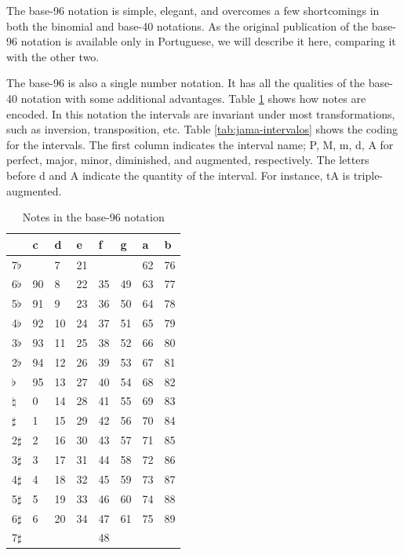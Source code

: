 \documentclass{article}
\begin{document}
The base-96 notation is simple, elegant, and overcomes a few
shortcomings in both the binomial and base-40 notations. As the
original publication of the base-96 notation is available only in
Portuguese, we will describe it here, comparing it with the other
two. 

The base-96 is also a single number notation. It has all the qualities
of the base-40 notation with some additional advantages. Table
\ref{tab:jama-notas} shows how notes are encoded. In this notation the
intervals are invariant under most transformations, such as inversion,
transposition, etc. Table \ref{tab:jama-intervalos} shows the coding
for the intervals. The first column indicates the interval name; P, M,
m, d, A for perfect, major, minor, diminished, and augmented,
respectively. The letters before d and A indicate the quantity of the
interval. For instance, tA is triple-augmented.

\begin{table}
  \centering
  \begin{tabular}{l|lllllll}
               & c & d& e& f& g& a& b \\
    \hline
    7$\flat$   &   & 7&21&  &  &62&76 \\
    6$\flat$   & 90& 8&22&35&49&63&77 \\
    5$\flat$   & 91& 9&23&36&50&64&78 \\
    4$\flat$   & 92&10&24&37&51&65&79 \\
    3$\flat$   & 93&11&25&38&52&66&80 \\
    2$\flat$   & 94&12&26&39&53&67&81 \\
    $\flat$    & 95&13&27&40&54&68&82 \\
    $\natural$ &  0&14&28&41&55&69&83 \\
    $\sharp$   &  1&15&29&42&56&70&84 \\
    2$\sharp$  &  2&16&30&43&57&71&85 \\
    3$\sharp$  &  3&17&31&44&58&72&86 \\
    4$\sharp$  &  4&18&32&45&59&73&87 \\
    5$\sharp$  &  5&19&33&46&60&74&88 \\
    6$\sharp$  &  6&20&34&47&61&75&89 \\
    7$\sharp$  &   &  &  &48&  &  &   \\
  \end{tabular}
  \caption{Notes in the base-96 notation}
  \label{tab:jama-notas}
\end{table}
\end{document}
